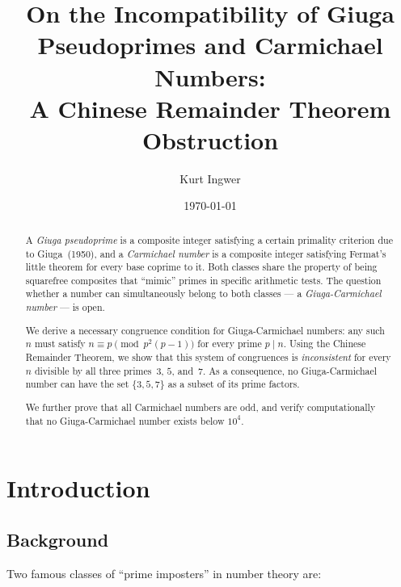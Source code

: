 \documentclass[12pt,a4paper]{amsart}
\theoremstyle{definition}
\begin{document}

\title{On the Incompatibility of Giuga Pseudoprimes and Carmichael Numbers:\\
       A Chinese Remainder Theorem Obstruction}

\author{Kurt Ingwer}
\address{Specialist Mathematics Project, Version Build 43}
\date{\today}

\begin{abstract}
A \emph{Giuga pseudoprime} is a composite integer satisfying a certain
primality criterion due to Giuga~(1950), and a \emph{Carmichael number} is a
composite integer satisfying Fermat's little theorem for every base coprime
to it.  Both classes share the property of being squarefree composites that
``mimic'' primes in specific arithmetic tests.  The question whether a number
can simultaneously belong to both classes — a \emph{Giuga-Carmichael number} —
is open.

We derive a necessary congruence condition for Giuga-Carmichael numbers:
any such~$n$ must satisfy $n \equiv p \pmod{p^2(p-1)}$ for every prime $p \mid n$.
Using the Chinese Remainder Theorem, we show that this system of congruences
is \emph{inconsistent} for every $n$ divisible by all three primes~$3$, $5$,
and~$7$.  As a consequence, no Giuga-Carmichael number can have the set
$\{3, 5, 7\}$ as a subset of its prime factors.

We further prove that all Carmichael numbers are odd, and verify computationally
that no Giuga-Carmichael number exists below $10^4$.
\end{abstract}

\maketitle

\section{Introduction}

\subsection{Background}

Two famous classes of ``prime imposters'' in number theory are:
\end{document}
